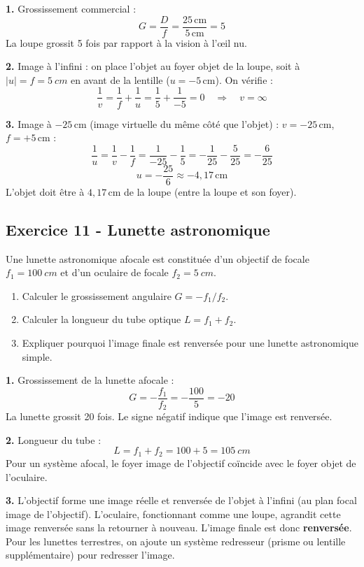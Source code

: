 \documentclass[12pt,a4paper]{article}
\begin{document}
\begin{boitecorrige}
\textbf{1.} Grossissement commercial :
\[
G = \frac{D}{f} = \frac{25\,\text{cm}}{5\,\text{cm}} = 5
\]
La loupe grossit 5 fois par rapport à la vision à l'\oe{}il nu.

\textbf{2.} Image à l'infini : on place l'objet au foyer objet de la loupe, soit à $|u| = f = \qty{5}{cm}$ en avant de la lentille ($u = -5\,\text{cm}$). On vérifie :
\[
\frac{1}{v} = \frac{1}{f} + \frac{1}{u} = \frac{1}{5} + \frac{1}{-5} = 0 \quad \Rightarrow \quad v = \infty
\]

\textbf{3.} Image à $-25\,\text{cm}$ (image virtuelle du même côté que l'objet) : $v = -25\,\text{cm}$, $f = +5\,\text{cm}$ :
\[
\frac{1}{u} = \frac{1}{v} - \frac{1}{f} = \frac{1}{-25} - \frac{1}{5} = -\frac{1}{25} - \frac{5}{25} = -\frac{6}{25}
\]
\[
u = -\frac{25}{6} \approx -4{,}17\,\text{cm}
\]
L'objet doit être à $4{,}17\,\text{cm}$ de la loupe (entre la loupe et son foyer).
\end{boitecorrige}

\subsection*{Exercice 11 - Lunette astronomique \niveau{\moyen}}

\begin{boiteexercice}
Une lunette astronomique afocale est constituée d'un objectif de focale $f_1 = \qty{100}{cm}$ et d'un oculaire de focale $f_2 = \qty{5}{cm}$.
\begin{enumerate}
  \item Calculer le grossissement angulaire $G = -f_1/f_2$.
  \item Calculer la longueur du tube optique $L = f_1 + f_2$.
  \item Expliquer pourquoi l'image finale est renversée pour une lunette astronomique simple.
\end{enumerate}
\end{boiteexercice}

\begin{boitecorrige}
\textbf{1.} Grossissement de la lunette afocale :
\[
G = -\frac{f_1}{f_2} = -\frac{100}{5} = -20
\]
La lunette grossit 20 fois. Le signe négatif indique que l'image est renversée.

\textbf{2.} Longueur du tube :
\[
L = f_1 + f_2 = 100 + 5 = \qty{105}{cm}
\]
Pour un système afocal, le foyer image de l'objectif coïncide avec le foyer objet de l'oculaire.

\textbf{3.} L'objectif forme une image réelle et renversée de l'objet à l'infini (au plan focal image de l'objectif). L'oculaire, fonctionnant comme une loupe, agrandit cette image renversée sans la retourner à nouveau. L'image finale est donc \textbf{renversée}. Pour les lunettes terrestres, on ajoute un système redresseur (prisme ou lentille supplémentaire) pour redresser l'image.
\end{boitecorrige}
\end{document}

